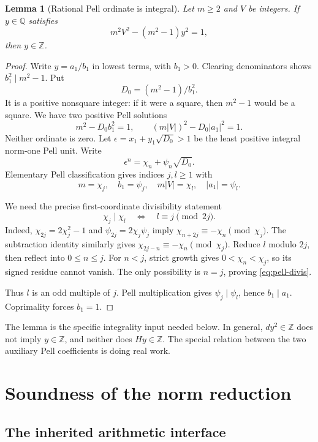 \documentclass[11pt]{article}
\newtheorem{lemma}[theorem]{Lemma}
\theoremstyle{remark}\newtheorem{remark}[theorem]{Remark}
\newcommand{\Z}{\mathbb Z}
\newcommand{\Q}{\mathbb Q}
\begin{document}
\begin{lemma}[Rational Pell ordinate is integral]\label{lem:rational}
Let \(m\ge2\) and \(V\) be integers. If \(y\in\Q\) satisfies
\[
 m^2V^2-(m^2-1)y^2=1,
\]
then \(y\in\Z\).
\end{lemma}

\begin{proof}
Write \(y=a_1/b_1\) in lowest terms, with \(b_1>0\).
Clearing denominators shows \(b_1^2\mid m^2-1\). Put
\[
 D_0=(m^2-1)/b_1^2.
\]
It is a positive nonsquare integer: if it were a square, then
\(m^2-1\) would be a square. We have two positive Pell solutions
\[
 m^2-D_0b_1^2=1,\qquad
 (m|V|)^2-D_0|a_1|^2=1.
\]
Neither ordinate is zero. Let
\(\epsilon=x_1+y_1\sqrt{D_0}>1\) be the least positive integral
norm-one Pell unit. Write
\[
 \epsilon^n=\chi_n+\psi_n\sqrt{D_0}.
\]
Elementary Pell classification gives indices \(j,l\ge1\) with
\[
 m=\chi_j,\quad b_1=\psi_j,\quad
 m|V|=\chi_l,\quad |a_1|=\psi_l.
\]

We need the precise first-coordinate divisibility statement
\begin{equation}\label{eq:pell-divis}
 \chi_j\mid\chi_l
 \quad\Longleftrightarrow\quad
 l\equiv j\pmod{2j}.
\end{equation}
Indeed, \(\chi_{2j}=2\chi_j^2-1\) and
\(\psi_{2j}=2\chi_j\psi_j\) imply
\(\chi_{n+2j}\equiv-\chi_n\pmod{\chi_j}\).
The subtraction identity similarly gives
\(\chi_{2j-n}\equiv-\chi_n\pmod{\chi_j}\).
Reduce \(l\) modulo \(2j\), then reflect into \(0\le n\le j\).
For \(n<j\), strict growth gives \(0<\chi_n<\chi_j\), so its signed
residue cannot vanish. The only possibility is \(n=j\), proving
\eqref{eq:pell-divis}.

Thus \(l\) is an odd multiple of \(j\). Pell multiplication gives
\(\psi_j\mid\psi_l\), hence \(b_1\mid a_1\). Coprimality forces
\(b_1=1\).
\end{proof}

The lemma is the specific integrality input needed below. In general,
\(dy^2\in\Z\) does not imply \(y\in\Z\), and neither does
\(Hy\in\Z\). The special relation between the two auxiliary Pell
coefficients is doing real work.

\section{Soundness of the norm reduction}\label{sec:soundness}

\subsection{The inherited arithmetic interface}
\end{document}
